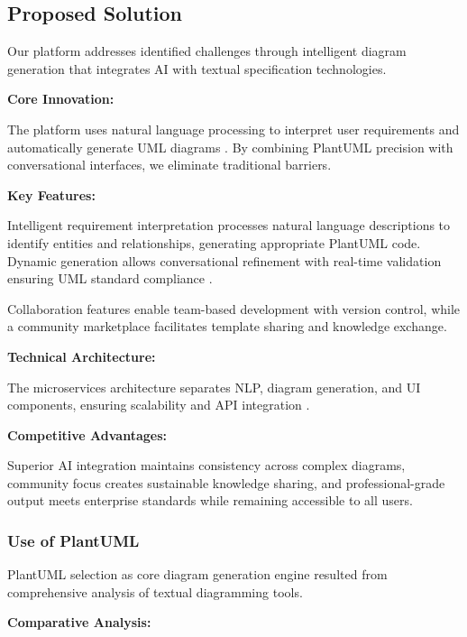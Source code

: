 \subsection{Proposed Solution}

Our platform addresses identified challenges through intelligent diagram generation that integrates AI with textual specification technologies.

\textbf{Core Innovation:}

The platform uses natural language processing to interpret user requirements and automatically generate UML diagrams \cite{nlp_diagramming}. By combining PlantUML precision with conversational interfaces, we eliminate traditional barriers.

\textbf{Key Features:}

Intelligent requirement interpretation processes natural language descriptions to identify entities and relationships, generating appropriate PlantUML code. Dynamic generation allows conversational refinement with real-time validation ensuring UML standard compliance \cite{plantuml_standards}.

Collaboration features enable team-based development with version control, while a community marketplace facilitates template sharing and knowledge exchange.

\textbf{Technical Architecture:}

The microservices architecture separates NLP, diagram generation, and UI components, ensuring scalability and API integration \cite{microservices_design}.

\textbf{Competitive Advantages:}

Superior AI integration maintains consistency across complex diagrams, community focus creates sustainable knowledge sharing, and professional-grade output meets enterprise standards while remaining accessible to all users.

\subsubsection{Use of PlantUML}

PlantUML selection as core diagram generation engine resulted from comprehensive analysis of textual diagramming tools.

\textbf{Comparative Analysis:}

